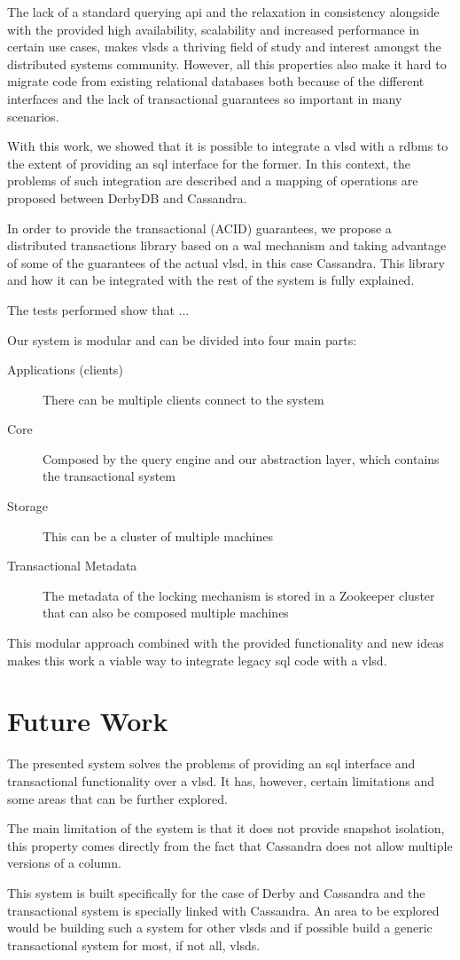 \label{sec:conclusion}
The lack of a standard querying \ac{api} and the relaxation in consistency alongside with the provided high availability, scalability and increased performance in certain use cases, makes \acp{vlsd} a thriving field of study and interest amongst the distributed systems community. However, all this properties also make it hard to migrate code from existing relational databases both because of the different interfaces and the lack of transactional guarantees so important in many scenarios.

With this work, we showed that it is possible to integrate a \ac{vlsd} with a \ac{rdbms} to the extent of providing an \ac{sql} interface for the former. In this context, the problems of such integration are described and a mapping of operations are proposed between DerbyDB and Cassandra.

In order to provide the transactional (ACID) guarantees, we propose a distributed transactions library based on a \ac{wal} mechanism and taking advantage of some of the guarantees of the actual \ac{vlsd}, in this case Cassandra. This library and how it can be integrated with the rest of the system is fully explained.

The tests performed show that ...  

Our system is modular and can be divided into four main parts:
\begin{description}
	\item[Applications (clients)] There can be multiple clients connect to the system
	\item[Core] Composed by the query engine and our abstraction layer, which contains the transactional system
	\item[Storage] This can be a cluster of multiple machines
	\item[Transactional Metadata] The metadata of the locking mechanism is stored in a Zookeeper cluster that can also be composed multiple machines
\end{description}

This modular approach combined with the provided functionality and new ideas makes this work a viable way to integrate legacy \ac{sql} code with a \ac{vlsd}. 

\section{Future Work}
The presented system solves the problems of providing an \ac{sql} interface and transactional functionality over a \ac{vlsd}. It has, however, certain limitations and some areas that can be further explored.

The main limitation of the system is that it does not provide snapshot isolation, this property comes directly from the fact that Cassandra does not allow multiple versions of a column.

This system is built specifically for the case of Derby and Cassandra and the transactional system is specially linked with Cassandra. An area to be explored would be building such a system for other \acp{vlsd} and if possible build a generic transactional system for most, if not all, \acp{vlsd}. 